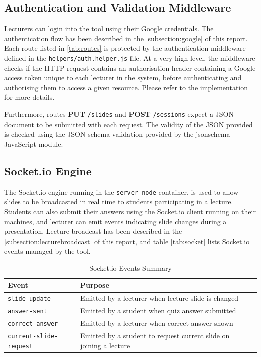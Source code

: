 \subsection{Authentication and Validation Middleware}
Lecturers can login into the tool using their Google credentials. The authentication
flow has been described in the \autoref{subsection:google} of this report. Each route
listed in \autoref{tab:routes} is protected by the authentication middleware defined
in the \texttt{helpers/auth.helper.js} file. At a very high level, the middleware
checks if the HTTP request contains an authorisation header containing a Google access
token unique to each lecturer in the system, before authenticating and authorising them
to access a given resource. Please refer to the implementation for more details.

Furthermore, routes \textbf{PUT} \texttt{/slides} and \textbf{POST} \texttt{/sessions} expect
a JSON document to be submitted with each request. The validity of the JSON provided is
checked using the JSON schema validation provided by the jsonschema\cite{58} JavaScript module.

\subsection{Socket.io Engine}
The Socket.io engine running in the \texttt{server\_node} container, is used to allow slides to be broadcasted in real time to students
participating in a lecture. Students can also submit their answers using the
Socket.io client running on their machines, and lecturer can emit events indicating
slide changes during a presentation. Lecture broadcast has been described in the \autoref{subsection:lecturebroadcast}
of this report, and table \autoref{tab:socket} lists Socket.io events managed by the tool.

\begin{table}[h!]
\centering
\begin{tabular}{|l|l|l|}
\hline
\textbf{Event} & \textbf{Purpose} \\ \hline
\texttt{slide-update} & Emitted by a lecturer when lecture slide is changed \\ \hline
\texttt{answer-sent} & Emitted by a student when quiz answer submitted \\ \hline
\texttt{correct-answer} & Emitted by a lecturer when correct answer shown \\ \hline
\texttt{current-slide-request} & Emitted by a student to request current slide on joining a lecture \\ \hline
\end{tabular}
\caption{Socket.io Events Summary}
\label{tab:socket}
\end{table}

